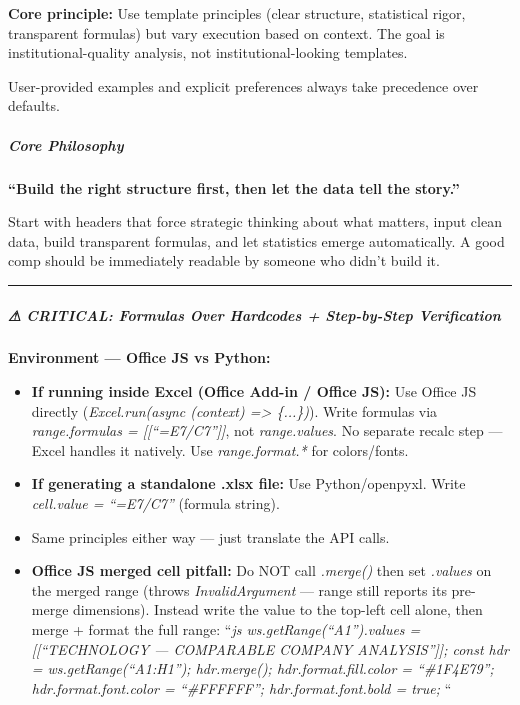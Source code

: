 \documentclass[11pt]{article}
\begin{document}
\textbf{Core principle:} Use template principles (clear structure, statistical rigor, transparent formulas) but vary execution based on context. The goal is institutional-quality analysis, not institutional-looking templates.


User-provided examples and explicit preferences always take precedence over defaults.


\subparagraph{Core Philosophy}\mbox{}\par
\textbf{``Build the right structure first, then let the data tell the story.''}


Start with headers that force strategic thinking about what matters, input clean data, build transparent formulas, and let statistics emerge automatically. A good comp should be immediately readable by someone who didn't build it.


\vspace{0.5em}\hrule\vspace{0.5em}

\subparagraph{⚠ CRITICAL: Formulas Over Hardcodes + Step-by-Step Verification}\mbox{}\par

\textbf{Environment — Office JS vs Python:}

\begin{itemize}[leftmargin=*,itemsep=2pt,topsep=2pt]
\item {} \textbf{If running inside Excel (Office Add-in / Office JS):} Use Office JS directly (\emph{Excel.run(async (context) => \{...\})}). Write formulas via \emph{range.formulas = [[``=E7/C7'']]}, not \emph{range.values}. No separate recalc step — Excel handles it natively. Use \emph{range.format.*} for colors/fonts.
\item {} \textbf{If generating a standalone .xlsx file:} Use Python/openpyxl. Write \emph{cell.value = ``=E7/C7''} (formula string).
\item {} Same principles either way — just translate the API calls.
\item {} \textbf{Office JS merged cell pitfall:} Do NOT call \emph{.merge()} then set \emph{.values} on the merged range (throws \emph{InvalidArgument} — range still reports its pre-merge dimensions). Instead write the value to the top-left cell alone, then merge + format the full range: ``\emph{js ws.getRange(``A1'').values = [[``TECHNOLOGY — COMPARABLE COMPANY ANALYSIS'']]; const hdr = ws.getRange(``A1:H1''); hdr.merge(); hdr.format.fill.color = ``\#1F4E79''; hdr.format.font.color = ``\#FFFFFF''; hdr.format.font.bold = true; }``
\end{itemize}
\end{document}
